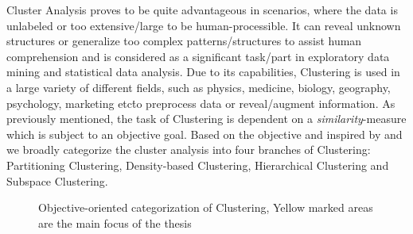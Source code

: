 Cluster Analysis proves to be quite advantageous in scenarios, where the data is unlabeled or too extensive/large to be human-processible. It can reveal unknown structures or generalize too complex patterns/structures to assist human comprehension and is considered as a significant task/part in exploratory data mining and statistical data analysis. Due to its capabilities, Clustering is used in a large variety of different fields, such as physics, medicine, biology, geography, psychology, marketing etc\. to preprocess data or reveal/augment information\cite{kriegel2009clustering}.
As previously mentioned, the task of Clustering is dependent on a \textit{similarity}-measure which is subject to an objective goal. Based on the objective and inspired by \textcite{validationhalkidi2001clustering} and \textcite[Ch.10.1.3]{han2011data} we broadly categorize the cluster analysis into four branches of Clustering: Partitioning Clustering, Density-based Clustering, Hierarchical Clustering and Subspace Clustering. 

\begin{figure}
    \centering
    \caption{Objective-oriented categorization of Clustering, Yellow marked areas are the main focus of the thesis}
    \label{fig:clusteringtree}
\end{figure}


